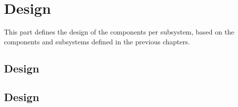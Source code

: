 \part{\LibName{} Design}
\label{sec:Design}

This part defines the design of the components per subsystem, based on the components and subsystems defined in the previous chapters.




\chapter{\SUBSTechBase{} Design}
\label{sec:SUBSUtilitydes}





\chapter{\SUBSLowLevel{} Design}
\label{sec:SUBSLowLeveldes}


%
%

%
%
